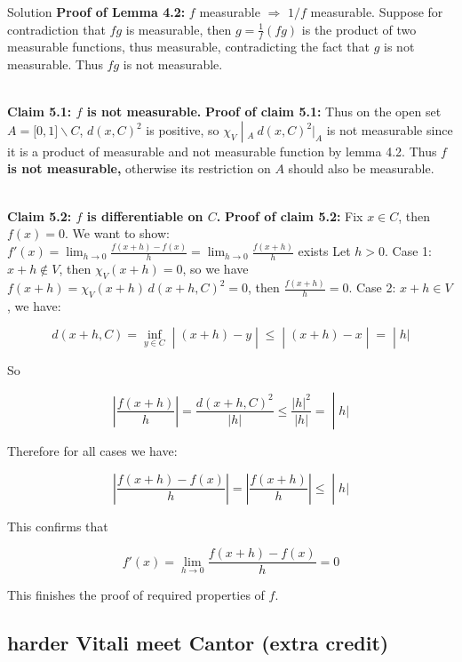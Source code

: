 \begin{qlsolution}{Solution}
\textbf{Proof of Lemma 4.2:} \(f\) measurable \(\Longrightarrow\) \(1/f\) measurable. Suppose for contradiction that \(fg\) is measurable, then \(g = \frac{1}{f}(fg)\) is the product of two measurable functions, thus measurable, contradicting the fact that \(g\) is not measurable. Thus \(fg\) is not measurable.\\
\strut \\
\textbf{Claim 5.1: \(f\) is not measurable.} \textbf{Proof of claim 5.1:} Thus on the open set \(A = \lbrack 0,1\rbrack\backslash C\), \(d(x,C)^{2}\) is positive, so \(\left. \chi_{V} \middle| {}_{A}\ d(x,C)^{2}|_{A} \right.\) is not measurable since it is a product of measurable and not measurable function by lemma 4.2. Thus \textbf{\(f\) is not measurable,} otherwise its restriction on \(A\) should also be measurable.\\
\strut \\
\textbf{Claim 5.2: \(f\) is differentiable on \(C\).} \textbf{Proof of claim 5.2:} Fix \(x \in C\), then \(f(x) = 0\). We want to show:\(f'(x) = \lim_{h\rightarrow 0}\frac{f(x + h) - f(x)}{h} = \lim_{h\rightarrow 0}\frac{f(x + h)}{h}\) exists Let \(h > 0\). Case 1: \(x + h \notin V\), then \(\chi_{V}(x + h) = 0\), so we have \(f(x + h) = \chi_{V}(x + h)\, d(x + h,C)^{2} = 0\), then \(\frac{f(x + h)}{h} = 0\). Case 2: \(x + h \in V\), we have:

\[\left. d(x + h,C) = \inf\limits_{y \in C} \middle| (x + h) - y \middle| \leq \middle| (x + h) - x \middle| = \middle| h| \right.\]

So

\[\left. \left| \frac{f(x + h)}{h} \right| = \frac{d(x + h,C)^{2}}{|h|} \leq \frac{|h|^{2}}{|h|} = \middle| h| \right.\]

Therefore for all cases we have:

\[\left. \left| \frac{f(x + h) - f(x)}{h} \right| = \left| \frac{f(x + h)}{h} \right| \leq \middle| h| \right.\]

This confirms that

\[f'(x) = \lim\limits_{h\rightarrow 0}\frac{f(x + h) - f(x)}{h} = 0\]

This finishes the proof of required properties of \(f\).

\end{qlsolution}

\subsection{harder Vitali meet Cantor (extra credit)}\label{harder-vitali-meet-cantor-extra-credit}

